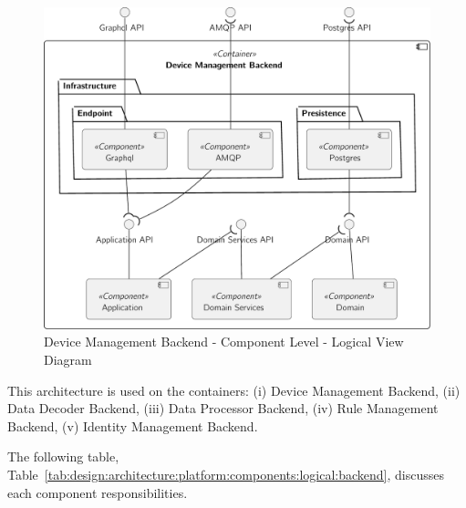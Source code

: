 \begin{figure}[H]
   \centering
   \includegraphics[page=1,width=0.8\columnwidth]{assets/diagrams/design/architectural/level3/logical/device-management-backend.pdf}
   \caption[Device Management Backend - Component Level - Logical View Diagram]{Device Management Backend - Component Level - Logical View Diagram}
   \label{fig:design:architecture:platform:component:logical:diagram:device}
\end{figure}

This architecture is used on the containers: (i) Device Management Backend, (ii) Data Decoder Backend, (iii) Data Processor Backend, (iv) Rule Management Backend, (v) Identity Management Backend.

The following table, Table~\ref{tab:design:architecture:platform:components:logical:backend}, discusses each component responsibilities.

